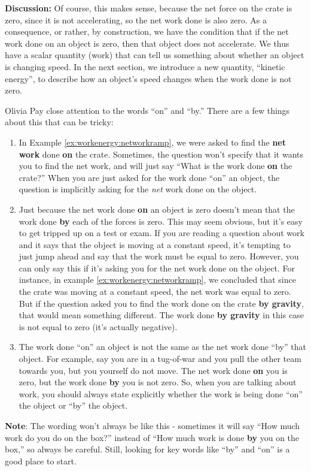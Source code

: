\begin{example}
\textbf{Discussion:} Of course, this makes sense, because the net force on the crate is zero, since it is not accelerating, so the net work done is also zero. As a consequence, or rather, by construction, we have the condition that if the net work done on an object is zero, then that object does not accelerate. We thus have a scalar quantity (work) that can tell us something about whether an object is changing speed. In the next section, we introduce a new quantity, ``kinetic energy'', to describe how an object's speed changes when the work done is not zero.
\end{example}

\newpage
\begin{studentOpinion}{Olivia} Pay close attention to the words ``on'' and ``by.'' There are a few things about this that can be tricky:
\begin{enumerate}
\item In Example \ref{ex:workenergy:networkramp}, we were asked to find the \textbf{net work} done \textbf{on} the crate. Sometimes, the question won't specify that it wants you to find the net work, and will just say ``What is the work done \textbf{on} the crate?'' When you are just asked for the work done ``on'' an object, the question is implicitly asking for the \textit{net} work done on the object. \\

\item Just because the net work done \textbf{on} an object is zero doesn't mean that the work done \textbf{by} each of the forces is zero. This may seem obvious, but it's easy to get tripped up on a test or exam. If you are reading a question about work and it says that the object is moving at a constant speed, it's tempting to just jump ahead and say that the work must be equal to zero. However, you can only say this if it's asking you for the net work done on the object. For instance, in example \ref{ex:workenergy:networkramp}, we concluded that since the crate was moving at a constant speed, the net work was equal to zero. But if the question asked you to find the work done on the crate \textbf{by gravity}, that would mean something different. The work done \textbf{by gravity} in this case is not equal to zero (it's actually negative). \\

\item The work done ``on'' an object is not the same as the net work done ``by'' that object. For example, say you are in a tug-of-war and you pull the other team towards you, but you yourself do not move. The net work done \textbf{on} you is zero, but the work done \textbf{by} you is not zero. So, when you are talking about work, you should always state explicitly whether the work is being done ``on'' the object or ``by'' the object. 
\end{enumerate}
\textbf{Note}: The wording won't always be like this - sometimes it will say ``How much work do you do on the box?'' instead of ``How much work is done \textbf{by} you on the box,'' so always be careful. Still, looking for key words like ``by'' and ``on'' is a good place to start. 
\end{studentOpinion}

